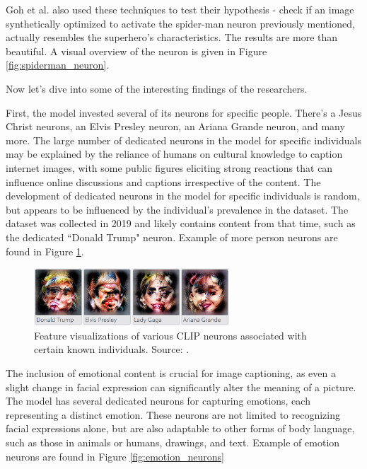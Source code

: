 \documentclass{article}
\begin{document}
\medskip
\noindent
Goh et al. also used these techniques to test their hypothesis - check if an image synthetically optimized to activate the spider-man neuron previously mentioned, actually resembles the superhero's characteristics. The results are more than beautiful. A visual overview of the neuron is given in Figure \ref{fig:spiderman_neuron}.

\medskip
\noindent
Now let's dive into some of the interesting findings of the researchers.

\medskip
\noindent
First, the model invested several of its neurons for specific people. There's a Jesus Christ neurons, an Elvis Presley neuron, an Ariana Grande neuron, and many more. The large number of dedicated neurons in the model for specific individuals may be explained by the reliance of humans on cultural knowledge to caption internet images, with some public figures eliciting strong reactions that can influence online discussions and captions irrespective of the content. The development of dedicated neurons in the model for specific individuals is random, but appears to be influenced by the individual's prevalence in the dataset. The dataset was collected in 2019 and likely contains content from that time, such as the dedicated ``Donald Trump" neuron. Example of more person neurons are found in Figure \ref{fig:person_neurons}.

\begin{figure}[ht!]
    \begin{center}
        \includegraphics[width=0.65\textwidth]{figures/person_neurons.png}
    \end{center}
    \caption{
        Feature visualizations of various CLIP neurons associated with certain known individuals. Source: \citet{radford2021clip}.
    }
    \label{fig:person_neurons}
\end{figure}

\medskip
\noindent
The inclusion of emotional content is crucial for image captioning, as even a slight change in facial expression can significantly alter the meaning of a picture. The model has several dedicated neurons for capturing emotions, each representing a distinct emotion. These neurons are not limited to recognizing facial expressions alone, but are also adaptable to other forms of body language, such as those in animals or humans, drawings, and text. Example of emotion neurons are found in Figure \ref{fig:emotion_neurons}
\end{document}
